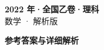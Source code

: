 \documentclass[zihao=-4, a4paper]{ctexart}
\begin{document}
\begin{center}
  {\Large\bfseries 2022 年·全国乙卷·理科}\\[4pt]
  {\large 数学 · 解析版}
\end{center}
\medskip
{}

\clearpage
{}
\begin{center}{\Large\bfseries 参考答案与详细解析}\end{center}
\medskip

\end{document}
